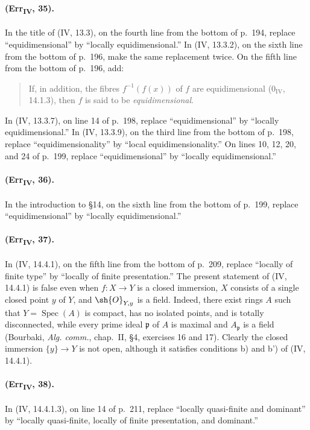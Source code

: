 \paragraph{(Err\textsubscript{IV}, 35).}
In the title of (IV, 13.3), on the fourth line from the bottom of p.~194,
replace ``equidimensional'' by ``locally equidimensional.''  In
(IV, 13.3.2), on the sixth line from the bottom of p.~196, make the same
replacement twice.  On the fifth line from the bottom of p.~196, add:
\begin{quote}
If, in addition, the fibres $f^{-1}(f(x))$ of $f$ are equidimensional
($0_{\mathrm{IV}}$, 14.1.3), then $f$ is said to be
\emph{equidimensional}.
\end{quote}
In (IV, 13.3.7), on line 14 of p.~198, replace ``equidimensional'' by
``locally equidimensional.''  In (IV, 13.3.9), on the third line from
the bottom of p.~198, replace ``equidimensionality'' by ``local
equidimensionality.''  On lines 10, 12, 20, and 24 of p.~199, replace
``equidimensional'' by ``locally equidimensional.''

\paragraph{(Err\textsubscript{IV}, 36).}
In the introduction to \S14, on the sixth line from the bottom of
p.~199, replace ``equidimensional'' by ``locally equidimensional.''

\paragraph{(Err\textsubscript{IV}, 37).}
In (IV, 14.4.1), on the fifth line from the bottom of p.~209, replace
``locally of finite type'' by ``locally of finite presentation.''  The
present statement of (IV, 14.4.1) is false even when $f:X\to Y$ is a
closed immersion, $X$ consists of a single closed point $y$ of $Y$, and
$\sh{O}_{Y,y}$ is a field.  Indeed, there exist rings $A$ such that
$Y=\operatorname{Spec}(A)$ is compact, has no isolated points, and is
totally disconnected, while every prime ideal $\mathfrak p$ of $A$ is
maximal and $A_\mathfrak p$ is a field (Bourbaki,
\emph{Alg. comm.}, chap.~II, \S4, exercises 16 and 17).  Clearly the
closed immersion $\{y\}\to Y$ is not open, although it satisfies
conditions b) and b') of (IV, 14.4.1).

\paragraph{(Err\textsubscript{IV}, 38).}
In (IV, 14.4.1.3), on line 14 of p.~211, replace ``locally quasi-finite
and dominant'' by ``locally quasi-finite, locally of finite presentation,
and dominant.''


